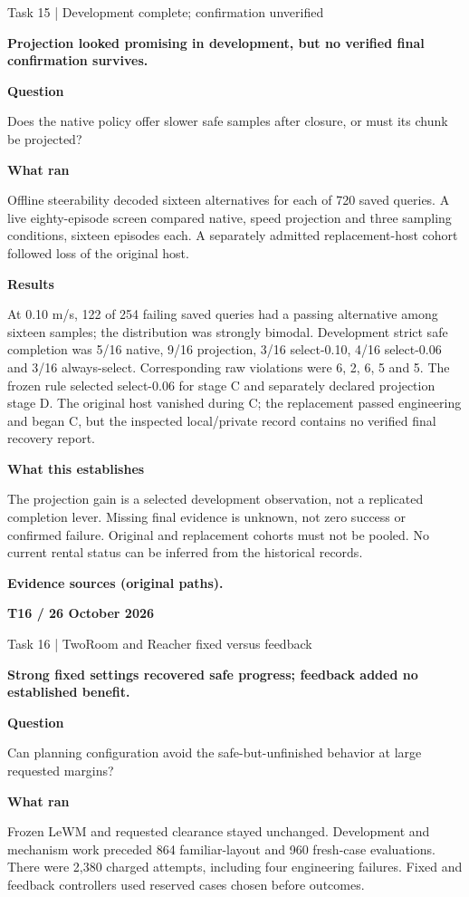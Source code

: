 \documentclass[11pt,a4paper]{article}
\newcommand{\block}[2]{\par\textbf{\color{ink}#1}\par\nopagebreak #2\par}
\newcommand{\finding}[1]{\begin{tcolorbox}[colback=pale,colframe=pale,boxrule=0pt,arc=1mm,left=10pt,right=10pt,top=10pt,bottom=10pt]\color{ink}\large\bfseries #1\end{tcolorbox}}
\begin{document}
{\color{muted}\small Task 15 | Development complete; confirmation unverified}\par\vspace{2mm}
\finding{Projection looked promising in development, but no verified final confirmation survives.}
\block{Question}{Does the native policy offer slower safe samples after closure, or must its chunk be projected?}
\block{What ran}{Offline steerability decoded sixteen alternatives for each of 720 saved queries. A live eighty-episode screen compared native, speed projection and three sampling conditions, sixteen episodes each. A separately admitted replacement-host cohort followed loss of the original host.}
\block{Results}{At 0.10 m/s, 122 of 254 failing saved queries had a passing alternative among sixteen samples; the distribution was strongly bimodal. Development strict safe completion was 5/16 native, 9/16 projection, 3/16 select-0.10, 4/16 select-0.06 and 3/16 always-select. Corresponding raw violations were 6, 2, 6, 5 and 5. The frozen rule selected select-0.06 for stage C and separately declared projection stage D. The original host vanished during C; the replacement passed engineering and began C, but the inspected local/private record contains no verified final recovery report.}
\block{What this establishes}{The projection gain is a selected development observation, not a replicated completion lever. Missing final evidence is unknown, not zero success or confirmed failure. Original and replacement cohorts must not be pooled. No current rental status can be inferred from the historical records.}
\vfill{\footnotesize\color{muted}\textbf{Evidence sources (original paths).}\par
\raggedright {}\par {}}
\clearpage
{}\label{exp:T16}
{\color{accent}\small\bfseries T16 / 26 October 2026}\par
{}\par
{\color{muted}\small Task 16 | TwoRoom and Reacher fixed versus feedback}\par\vspace{2mm}
\finding{Strong fixed settings recovered safe progress; feedback added no established benefit.}
\block{Question}{Can planning configuration avoid the safe-but-unfinished behavior at large requested margins?}
\block{What ran}{Frozen LeWM and requested clearance stayed unchanged. Development and mechanism work preceded 864 familiar-layout and 960 fresh-case evaluations. There were 2,380 charged attempts, including four engineering failures. Fixed and feedback controllers used reserved cases chosen before outcomes.}
\end{document}
